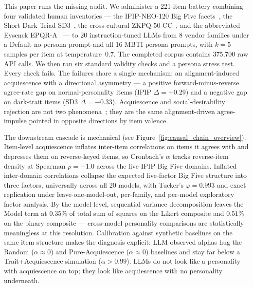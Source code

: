 \documentclass[11pt]{article}
\begin{document}
This paper runs the missing audit. We administer a 221-item battery combining four validated human inventories --- the IPIP-NEO-120 Big Five facets~\citep{johnson2014measuring}, the Short Dark Triad SD3~\citep{jones2014introducing}, the cross-cultural ZKPQ-50-CC~\citep{aluja2006cross}, and the abbreviated Eysenck EPQR-A~\citep{francis1992development} --- to 20 instruction-tuned LLMs from 8 vendor families under a Default no-persona prompt and all 16 MBTI persona prompts, with $k=5$ samples per item at temperature~$0.7$. The completed corpus contains 375{,}700 raw API calls. We then ran six standard validity checks and a persona stress test. Every check fails. The failures share a single mechanism: an alignment-induced acquiescence with a directional asymmetry --- a positive forward-minus-reverse agree-rate gap on normal-personality items (IPIP $\Delta=+0.29$) and a negative gap on dark-trait items (SD3 $\Delta=-0.33$). Acquiescence and social-desirability rejection are not two phenomena~\citep{couch1960yeasayers,crowne1960social,paulhus1991response,billiet2000modeling}; they are the same alignment-driven agree-impulse pointed in opposite directions by item valence.

The downstream cascade is mechanical (see Figure~\ref{fig:causal_chain_overview}). Item-level acquiescence inflates inter-item correlations on items it agrees with and depresses them on reverse-keyed items, so Cronbach's $\alpha$ tracks reverse-item density at Spearman $\rho=-1.0$ across the five IPIP Big Five domains. Inflated inter-domain correlations collapse the expected five-factor Big Five structure into three factors, universally across all 20 models, with Tucker's $\varphi=0.993$ and exact replication under leave-one-model-out, per-family, and per-model exploratory factor analysis. By the model level, sequential variance decomposition leaves the Model term at $0.35\%$ of total sum of squares on the Likert composite and $0.51\%$ on the binary composite --- cross-model personality comparisons are statistically meaningless at this resolution. Calibration against synthetic baselines on the same item structure makes the diagnosis explicit: LLM observed alphas hug the Random ($\alpha\!\approx\!0$) and Pure-Acquiescence ($\alpha\!\approx\!0$) baselines and stay far below a Trait+Acquiescence simulation ($\alpha>0.99$). LLMs do not look like a personality with acquiescence on top; they look like acquiescence with no personality underneath.
\end{document}
